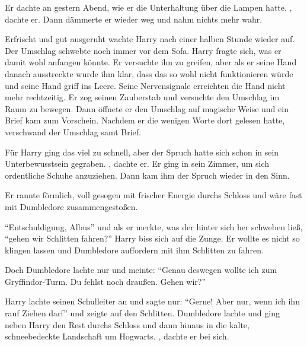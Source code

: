 Er dachte an gestern Abend, wie er die Unterhaltung über die Lampen hatte. , dachte er.  Dann dämmerte er wieder weg und nahm nichts mehr wahr.

Erfrischt und gut ausgeruht wachte Harry nach einer halben Stunde wieder auf. Der Umschlag schwebte noch immer vor dem Sofa. Harry fragte sich, was er damit wohl anfangen könnte. Er versuchte ihn zu greifen, aber als er seine Hand danach ausstreckte wurde ihm klar, dass das so wohl nicht funktionieren würde und seine Hand griff ins Leere. Seine Nervensignale erreichten die Hand nicht mehr rechtzeitig. Er zog seinen Zauberstab und versuchte den Umschlag im Raum zu bewegen. Dann öffnete er den Umschlag auf magische Weise und ein Brief kam zum Vorschein. Nachdem er die wenigen Worte dort gelesen hatte, verschwand der Umschlag samt Brief.

Für Harry ging das viel zu schnell, aber der Spruch hatte sich schon in sein Unterbewusstsein gegraben. , dachte er. Er ging in sein Zimmer, um sich ordentliche Schuhe anzuziehen. Dann kam ihm der Spruch wieder in den Sinn. 

Er rannte förmlich, voll gesogen mit frischer Energie durchs Schloss und wäre fast mit Dumbledore zusammengestoßen.

\enquote{Entschuldigung, Albus} und als er merkte, was der hinter sich her schweben ließ, \enquote{gehen wir Schlitten fahren?} Harry biss sich auf die Zunge. Er wollte es nicht so klingen lassen und Dumbledore auffordern mit ihm Schlitten zu fahren.

Doch Dumbledore lachte nur und meinte: \enquote{Genau deswegen wollte ich zum Gryffindor-Turm. Du fehlst noch draußen. Gehen wir?}

Harry lachte seinen Schulleiter an und sagte nur: \enquote{Gerne! Aber nur, wenn ich ihn rauf Ziehen darf} und zeigte auf den Schlitten. Dumbledore lachte und ging neben Harry den Rest durchs Schloss und dann hinaus in die kalte, schneebedeckte Landschaft um Hogwarts. , dachte er bei sich.

